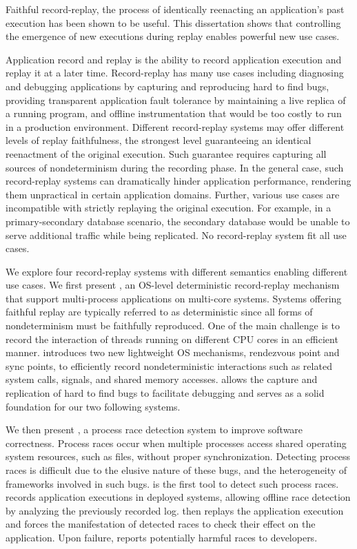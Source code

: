 Faithful record-replay, the process of identically reenacting an application's past execution has been shown to be useful.
This dissertation shows that controlling the emergence of new executions during replay enables powerful new use cases.

Application record and replay is the ability to record application execution and
replay it at a later time. Record-replay has many use cases including diagnosing and
debugging applications by capturing and reproducing hard to find bugs, providing
transparent application fault tolerance by maintaining a live replica of a running program,
and offline instrumentation that would be too costly to run in a production environment.
Different record-replay systems may offer different levels of replay faithfulness,
the strongest level guaranteeing an identical reenactment of the original execution.
Such guarantee requires capturing all sources of nondeterminism during the recording
phase. In the general case, such record-replay systems can dramatically hinder
application performance, rendering them unpractical in certain application domains.
Further, various use cases are incompatible with strictly replaying the original execution.
For example, in a primary-secondary database scenario, the secondary database
would be unable to serve additional traffic while being replicated.
No record-replay system fit all use cases.

We explore four record-replay systems with different semantics enabling different use cases.
We first present \scribe, an OS-level deterministic record-replay mechanism
that support multi-process applications on multi-core systems.
Systems offering faithful replay are typically referred to as deterministic
since all forms of nondeterminism must be faithfully reproduced.
One of the main
challenge is to record the interaction of threads running on different CPU cores
in an efficient manner.
\scribe introduces two new lightweight OS mechanisms, rendezvous point and sync
points, to efficiently record nondeterministic interactions such as related
system calls, signals, and shared memory accesses. \scribe allows the capture
and replication of hard to find bugs to facilitate debugging and serves as a
solid foundation for our two following systems.

We then present \racepro, a process race detection system to improve
software correctness. Process races occur when multiple processes access shared
operating system resources, such as files, without proper synchronization.
Detecting process races is difficult due to the elusive nature of these bugs,
and the heterogeneity of frameworks involved in such bugs.
\racepro is the first tool to detect such process races.
\racepro records application executions in deployed systems, allowing offline
race detection by analyzing the previously recorded log. \racepro then replays
the application execution and forces the manifestation of detected races to check their
effect on the application. Upon failure, \racepro reports potentially harmful
races to developers.

